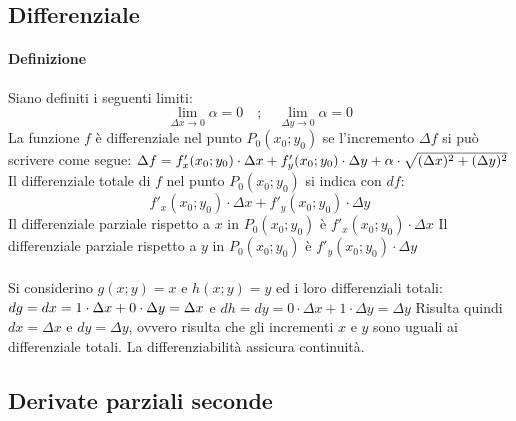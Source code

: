 \documentclass[a4paper,14pt]{extarticle}
\begin{document}
\subsection{Differenziale}
\paragraph{Definizione \\} Siano definiti i seguenti limiti: \large \[ \lim_{\Delta x \to 0} \alpha = 0 \quad;\quad \lim_{\Delta y \to 0} \alpha = 0\] \normalsize La  funzione $f$ è differenziale nel punto $P_0(x_0;y_0)$ se l'incremento $\Delta f$ si può scrivere come segue: $\\ \Delta f=f'_x (x_0;y_0) \cdot \Delta x + f'_y (x_0;y_0) \cdot \Delta y + \alpha \cdot \sqrt{(\Delta x)^2+(\Delta y)^2} \\$ \newline Il differenziale totale di $f$ nel punto $P_0(x_0;y_0)$ si indica con $df$: \large \[ f'_x (x_0;y_0) \cdot \Delta x + f'_y (x_0;y_0) \cdot \Delta y \] \normalsize Il differenziale parziale rispetto a $x$ in $P_0(x_0;y_0)$ è $f'_x (x_0;y_0) \cdot \Delta x$  \newline Il differenziale parziale rispetto a $y$ in $P_0(x_0;y_0)$ è $f'_y (x_0;y_0) \cdot \Delta y$
\paragraph{}Si considerino $g(x;y)=x$ e $h(x;y)=y$ ed i loro differenziali totali: $\\ dg=dx=1 \cdot \Delta x+0 \cdot \Delta y= \Delta x$ e $dh=dy=0 \cdot \Delta x+1 \cdot \Delta y= \Delta y$ \newline Risulta quindi $dx = \Delta x$ e $dy = \Delta y$, ovvero risulta che gli incrementi $x$ e $y$ sono uguali ai differenziale totali. \newline La differenziabilità assicura continuità.

\subsection{Derivate parziali seconde}
\end{document}

